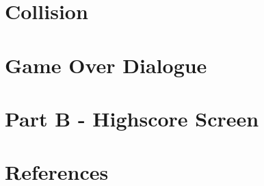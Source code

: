 \documentclass{article}
\begin{document}
\clearpage


\section{Collision}

\clearpage


\section{Game Over Dialogue}

\clearpage

\section{Part B - Highscore Screen}

\clearpage



\section{References}

\clearpage
\end{document}
